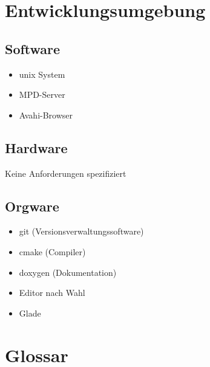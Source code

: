 \section{Entwicklungsumgebung}
\subsection{Software}
\begin{itemize}
	\item unix System
	\item MPD-Server	
	\item Avahi-Browser
\end{itemize}
\subsection{Hardware}
Keine Anforderungen spezifiziert
\subsection{Orgware}
\begin{itemize}
	\item git (Versionsverwaltungssoftware)
	\item cmake (Compiler)
	\item doxygen (Dokumentation)
	\item Editor nach Wahl
	\item Glade
\end{itemize}
\section{Glossar}
